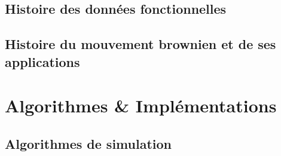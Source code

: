 \section{ Histoire des données fonctionnelles }

\pagebreak
\section{Histoire du mouvement brownien et de ses applications}

\pagebreak


\chapter{Algorithmes \& Implémentations}

\label{annexe:code}
\section{Algorithmes de simulation}



%

